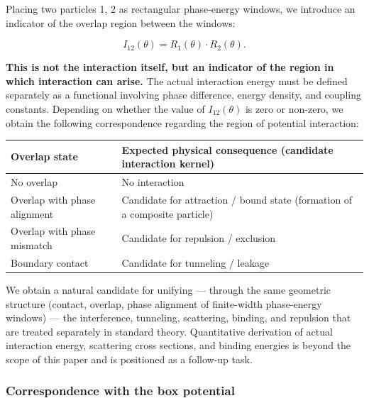 \documentclass[
]{article}
\newcounter{none} %
\begin{document}
Placing two particles 1, 2 as rectangular phase-energy windows, we
introduce an indicator of the overlap region between the windows:

\[
I_{12}(\theta) = R_1(\theta) \cdot R_2(\theta).
\]

\textbf{This is not the interaction itself, but an indicator of the
region in which interaction can arise.} The actual interaction energy
must be defined separately as a functional involving phase difference,
energy density, and coupling constants. Depending on whether the value
of \(I_{12}(\theta)\) is zero or non-zero, we obtain the following
correspondence regarding the region of potential interaction:

{\def\LTcaptype{none} %
\begin{longtable}[]{@{}
  >{\raggedright\arraybackslash}p{}
  >{\raggedright\arraybackslash}p{}@{}}
\toprule\noalign{}
\begin{minipage}[b]{\linewidth}\raggedright
Overlap state
\end{minipage} & \begin{minipage}[b]{\linewidth}\raggedright
Expected physical consequence (candidate interaction kernel)
\end{minipage} \\
\midrule\noalign{}
\endhead
\bottomrule\noalign{}
\endlastfoot
No overlap & No interaction \\
Overlap with phase alignment & Candidate for attraction / bound state
(formation of a composite particle) \\
Overlap with phase mismatch & Candidate for repulsion / exclusion \\
Boundary contact & Candidate for tunneling / leakage \\
\end{longtable}
}

We obtain a natural candidate for unifying --- through the same
geometric structure (contact, overlap, phase alignment of finite-width
phase-energy windows) --- the interference, tunneling, scattering,
binding, and repulsion that are treated separately in standard theory.
Quantitative derivation of actual interaction energy, scattering cross
sections, and binding energies is beyond the scope of this paper and is
positioned as a follow-up task.

\subsubsection{Correspondence with the box
potential}\label{correspondence-with-the-box-potential}
\end{document}
